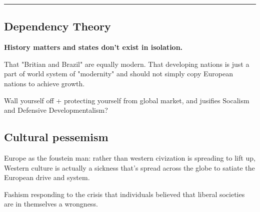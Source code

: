 \documentclass[letterpaper]{article}
\begin{document}
\noindent\rule{\textwidth}{0.5pt}

\subsection{Dependency Theory}
\label{sec:org48d5be0}
\textbf{History matters and states don't exist in isolation.}

That "Britian and Brazil" are equally modern. That developing nations is
just a part of world system of "modernity" and should not simply copy
European nations to achieve growth.

Wall yourself off + protecting yourself from global market, and jusifies
Socalism and Defensive Developmentalism?

\subsection{Cultural pessemism}
\label{sec:org5b08b32}
Europe as the foustein man: rather than western civization is spreading
to lift up, Western culture is actually a sickness that's spread across
the globe to satiate the European drive and system.

Fashism responding to the crisis that individuals believed that liberal
societies are in themselves a wrongness.
\end{document}
